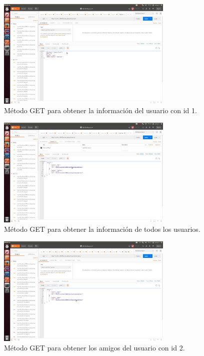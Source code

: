 \documentclass[12pt,a4paper, spanish]{article}
\begin{document}
\begin{figure}[H]
	\centering
	\includegraphics[width=0.75\textwidth]{images/captura3.jpg}
	\caption{Método GET para obtener la información del usuario con id 1.}
\end{figure}

\begin{figure}[H]
	\centering
	\includegraphics[width=0.75\textwidth]{images/captura4.jpg}
	\caption{Método GET para obtener la información de todos los usuarios.}
\end{figure}


\begin{figure}[H]
	\centering
	\includegraphics[width=0.75\textwidth]{images/captura6.jpg}
	\caption{Método GET para obtener los amigos del usuario con id 2.}
\end{figure}
\end{document}

